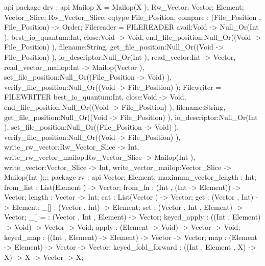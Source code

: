 api {   package drv
          : api {
                Mailop X = Mailop(X );
                Rw_Vector;
                Vector;
                Element;
                Vector_Slice;
                Rw_Vector_Slice;
                eqtype File_Position;
                compare : (File_Position , File_Position) -> Order;
                    Filereader
                    = FILEREADER        {avail:Void -> Null_Or(Int ), best_io_quantum:Int, close:Void -> Void,
                                        end_file_position:Null_Or((Void -> File_Position) ), filename:String,
                                        get_file_position:Null_Or((Void -> File_Position) ), io_descriptor:Null_Or(Int ),
                                        read_vector:Int -> Vector, read_vector_mailop:Int -> Mailop(Vector ),
                                        set_file_position:Null_Or((File_Position -> Void) ),
                                        verify_file_position:Null_Or((Void -> File_Position) )};
                    Filewriter
                    = FILEWRITER
                            {best_io_quantum:Int, close:Void -> Void, end_file_position:Null_Or((Void -> File_Position) ),
                            filename:String, get_file_position:Null_Or((Void -> File_Position) ), io_descriptor:Null_Or(Int ),
                            set_file_position:Null_Or((File_Position -> Void) ),
                            verify_file_position:Null_Or((Void -> File_Position) ), write_rw_vector:Rw_Vector_Slice -> Int,
                            write_rw_vector_mailop:Rw_Vector_Slice -> Mailop(Int ), write_vector:Vector_Slice -> Int,
                            write_vector_mailop:Vector_Slice -> Mailop(Int )};};;
        package rv
          : api {
                Vector;
                Element;
                maximum_vector_length : Int;
                from_list : List(Element ) -> Vector;
                from_fn : (Int , (Int -> Element)) -> Vector;
                length : Vector -> Int;
                cat : List(Vector ) -> Vector;
                get : (Vector , Int) -> Element;
                _[] : (Vector , Int) -> Element;
                set : (Vector , Int , Element) -> Vector;
                _[]:= : (Vector , Int , Element) -> Vector;
                keyed_apply : ((Int , Element) -> Void) -> Vector -> Void;
                apply : (Element -> Void) -> Vector -> Void;
                keyed_map : ((Int , Element) -> Element) -> Vector -> Vector;
                map : (Element -> Element) -> Vector -> Vector;
                keyed_fold_forward : ((Int , Element , X) -> X) -> X -> Vector -> X;
}}
